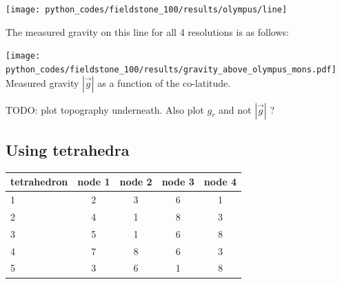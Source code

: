 \begin{center}
\texttt{[image: python\_codes/fieldstone\_100/results/olympus/line]}
\end{center}

The measured gravity on this line for all 4 resolutions is as follows:

\begin{center}
\texttt{[image: python\_codes/fieldstone\_100/results/gravity\_above\_olympus\_mons.pdf]}\\
{\captionfont Measured gravity $|\vec{g}|$ as a function of the co-latitude.}
\end{center}

TODO: plot topography underneath. Also plot $g_r$ and not $|\vec{g}|$ ?


\subsection*{Using tetrahedra}



\begin{center}
\end{center}

\begin{center}
\begin{tabular}{lcccc}
\hline
tetrahedron & node 1& node 2& node 3& node 4  \\
\hline
\hline
1&2&3&6&1 \\
2&4&1&8&3 \\
3&5&1&6&8 \\
4&7&8&6&3 \\
5&3&6&1&8 \\
\hline
\end{tabular}
\end{center}



